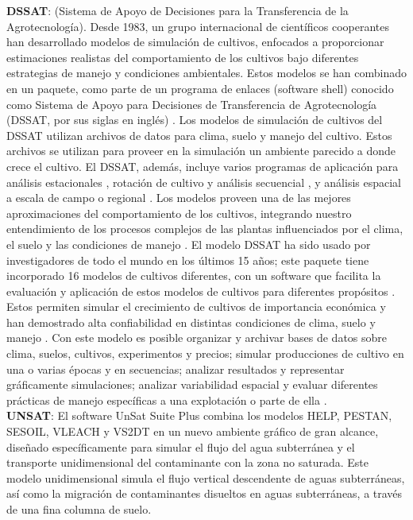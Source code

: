 \textbf{DSSAT}: (Sistema de Apoyo de Decisiones para la Transferencia de la Agrotecnología). Desde 1983, un grupo internacional de científicos cooperantes han desarrollado modelos de simulación de cultivos, enfocados a proporcionar estimaciones realistas del comportamiento de los cultivos bajo diferentes estrategias de manejo y condiciones ambientales. Estos modelos se han combinado en un paquete, como parte de un programa de enlaces (software shell) conocido como Sistema de Apoyo para Decisiones de Transferencia de Agrotecnología (DSSAT, por sus siglas en inglés) \parencite{jones1998decision}.
Los modelos de simulación de cultivos del DSSAT utilizan archivos de datos para clima, suelo y manejo del cultivo. Estos archivos se utilizan para proveer en la simulación un ambiente parecido a donde crece el cultivo. El DSSAT, además, incluye varios programas de aplicación para análisis estacionales \parencite{thornton1994computer}, rotación de cultivo y análisis secuencial \parencite{thornton1995computer}, y análisis espacial a escala de campo o regional \parencite{engel1997aegis, thornton1997computer}. Los modelos proveen una de las mejores aproximaciones del comportamiento de los cultivos, integrando nuestro entendimiento de los procesos complejos de las plantas influenciados por el clima, el suelo y las condiciones de manejo \parencite{white2003gene}.
El modelo DSSAT ha sido usado por investigadores de todo el mundo en los últimos 15 años; este paquete tiene incorporado 16 modelos de cultivos diferentes, con un software que facilita la evaluación y aplicación de estos modelos de cultivos para diferentes propósitos \parencite{jones2003dssat}. Estos permiten simular el crecimiento de cultivos de importancia económica y han demostrado alta confiabilidad en distintas condiciones de clima, suelo y manejo \parencite{jones1993decision}. Con este modelo es posible organizar y archivar bases de datos sobre clima, suelos, cultivos, experimentos y precios; simular producciones de cultivo en una o varias épocas y en secuencias; analizar resultados y representar gráficamente simulaciones; analizar variabilidad espacial y evaluar diferentes prácticas de manejo específicas a una explotación o parte de ella \parencite{giraldo2007adaptacion}.\\

\textbf{UNSAT}: El software UnSat Suite Plus combina los modelos HELP, PESTAN, SESOIL, VLEACH y VS2DT en un nuevo ambiente gráfico de gran alcance, diseñado específicamente para simular el flujo del agua subterránea y el transporte unidimensional del contaminante con la zona no saturada. Este modelo unidimensional simula el flujo vertical descendente de aguas subterráneas, así como la migración de contaminantes disueltos en aguas subterráneas, a través de una fina columna de suelo.

